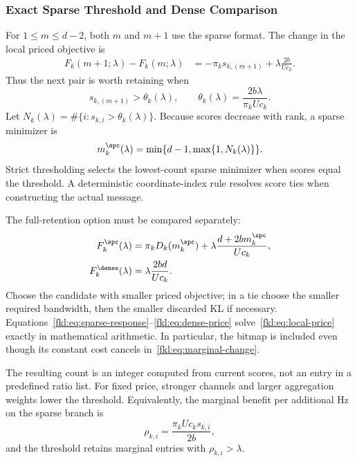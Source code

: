 \subsubsection{Exact Sparse Threshold and Dense Comparison}
For $1\le m\le d-2$, both $m$ and $m+1$ use the sparse format. The change in the local priced objective is
\begin{align}
 F_k(m+1;\lambda)-F_k(m;\lambda)
 &=-\pi_ks_{k,(m+1)}+\lambda\frac{2b}{Uc_k}.
 \label{fkl:eq:marginal-change}
\end{align}
Thus the next pair is worth retaining when
\begin{equation}
 s_{k,(m+1)}>\theta_k(\lambda),\qquad
 \theta_k(\lambda)=\frac{2b\lambda}{\pi_kUc_k}.
 \label{fkl:eq:threshold}
\end{equation}
Let $N_k(\lambda)=\#\{i:s_{k,i}>\theta_k(\lambda)\}$. Because scores decrease with rank, a sparse minimizer is
\begin{equation}
 m_k^{\spc}(\lambda)
 =\min\{d-1,\max\{1,N_k(\lambda)\}\}.
 \label{fkl:eq:sparse-response}
\end{equation}
Strict thresholding selects the lowest-count sparse minimizer when scores equal the threshold. A deterministic coordinate-index rule resolves score ties when constructing the actual message.

The full-retention option must be compared separately:
\begin{align}
 F_k^{\spc}(\lambda)
 &=\pi_kD_k(m_k^{\spc})
 +\lambda\frac{d+2b m_k^{\spc}}{Uc_k},\label{fkl:eq:sparse-price}\\
 F_k^{\dense}(\lambda)&=\lambda\frac{2bd}{Uc_k}.
 \label{fkl:eq:dense-price}
\end{align}
Choose the candidate with smaller priced objective; in a tie choose the smaller required bandwidth, then the smaller discarded KL if necessary. Equations~\eqref{fkl:eq:sparse-response}--\eqref{fkl:eq:dense-price} solve~\eqref{fkl:eq:local-price} exactly in mathematical arithmetic. In particular, the bitmap is included even though its constant cost cancels in~\eqref{fkl:eq:marginal-change}.

The resulting count is an integer computed from current scores, not an entry in a predefined ratio list. For fixed price, stronger channels and larger aggregation weights lower the threshold. Equivalently, the marginal benefit per additional Hz on the sparse branch is
\begin{equation}
 \rho_{k,i}=\frac{\pi_kUc_ks_{k,i}}{2b},
 \label{fkl:eq:priority}
\end{equation}
and the threshold retains marginal entries with $\rho_{k,i}>\lambda$.

